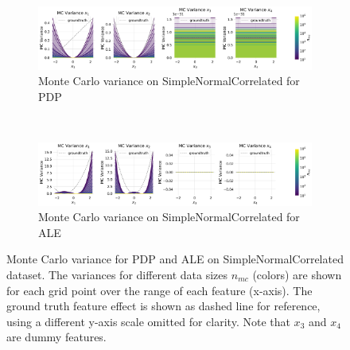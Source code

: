 \documentclass[runningheads]{llncs}
\begin{document}
\begin{figure}[h!]
    \centering
    \begin{subfigure}[b]{\textwidth}
        \centering
        \includegraphics[width=\textwidth]{img/SNC-all/mc_variance_pdp.png}
        \caption{Monte Carlo variance on SimpleNormalCorrelated for PDP}
    \end{subfigure}
    \\[10pt]
    \vfill
    \begin{subfigure}[b]{\textwidth}
        \centering
        \includegraphics[width=\textwidth]{img/SNC-all/mc_variance_ale.png}
        \caption{Monte Carlo variance on SimpleNormalCorrelated for ALE}
    \end{subfigure}
    \caption{Monte Carlo variance for PDP and ALE on SimpleNormalCorrelated dataset.
    The variances for different data sizes $n_{mc}$ (colors) are shown for each grid
    point over the range of each feature (x-axis). The ground truth feature effect is
    shown as dashed line for reference, using a different y-axis scale omitted for
    clarity. Note that $x_3$ and $x_4$ are dummy features.}
    \label{fig:mc-variance-snc}  %
\end{figure}
\end{document}
